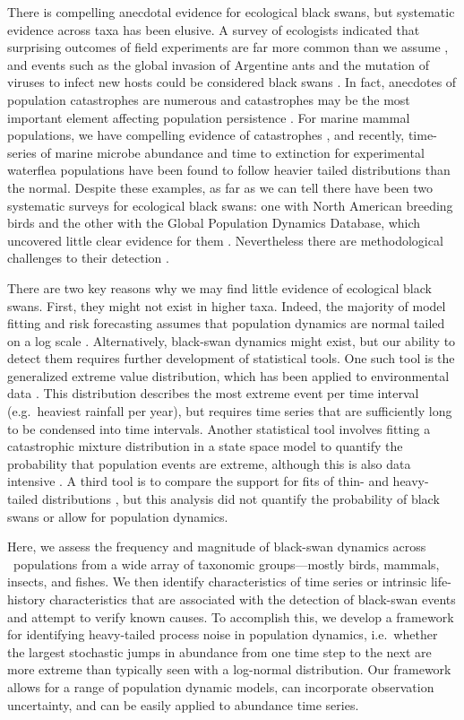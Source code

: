 There is compelling anecdotal evidence for ecological black swans, but
systematic evidence across taxa has been elusive. A survey of ecologists
indicated that surprising outcomes of field experiments are far more common
than we assume \citep{doak2008}, and events such as the global invasion of
Argentine ants and the mutation of viruses to infect new hosts could be
considered black swans \citep{nunez2012}. In fact, anecdotes of population
catastrophes are numerous and catastrophes may be the most important element
affecting population persistence \citep{mangel1994}. For marine mammal
populations, we have compelling evidence of catastrophes \citep{gerber2001,
  ward2007}, and recently, time-series of marine microbe abundance
\citep{segura2013} and time to extinction for experimental waterflea
populations \citep{drake2014} have been found to follow heavier tailed
distributions than the normal. Despite these examples, as far as we can tell
there have been two systematic surveys for ecological black swans: one with
North American breeding birds and the other with the Global Population
Dynamics Database, which uncovered little clear evidence for them
\citep{keitt1998,allen2001,halley2002}. Nevertheless there are methodological
challenges to their detection \citep{allen2001,ward2007}.

There are two key reasons why we may find little evidence of ecological black
swans. First, they might not exist in higher taxa. Indeed, the majority of
model fitting and risk forecasting assumes that population dynamics are normal
tailed on a log scale \citep[e.g.][]{brook2006a,dennis2006,knape2012}.
Alternatively, black-swan dynamics might exist, but our ability to detect
them requires further development of statistical tools. One such tool is the
generalized extreme value distribution, which has been applied to
environmental data \citep[e.g.][]{katz2005}. This distribution describes the
most extreme event per time interval (e.g.~heaviest rainfall per year), but
requires time series that are sufficiently long to be condensed into time
intervals. Another statistical tool involves fitting a catastrophic mixture
distribution in a state space model to quantify the probability that
population events are extreme, although this is also data intensive
\citep{ward2007}. A third tool is to compare the support for fits of thin- and
heavy-tailed distributions \citep{halley2002}, but this analysis did not
quantify the probability of black swans or allow for population dynamics.

Here, we assess the frequency and magnitude of black-swan dynamics across
\NPops\ populations from a wide array of taxonomic groups---mostly birds,
mammals, insects, and fishes. We then identify characteristics of time series
or intrinsic life-history characteristics that are associated with the
detection of black-swan events and attempt to verify known causes. To
accomplish this, we develop a framework for identifying heavy-tailed process
noise in population dynamics, i.e.\ whether the largest stochastic jumps in
abundance from one time step to the next are more extreme than typically seen
with a log-normal distribution. Our framework allows for a range of population
dynamic models, can incorporate observation uncertainty, and can be easily
applied to abundance time series.

